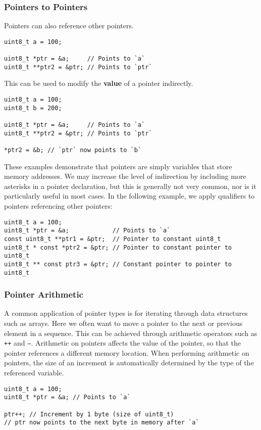 \documentclass{article}
\begin{document}
\subsubsection{Pointers to Pointers}
Pointers can also reference other pointers.
\begin{verbatim}
uint8_t a = 100;

uint8_t *ptr = &a;     // Points to `a`
uint8_t **ptr2 = &ptr; // Points to `ptr`
\end{verbatim}
This can be used to modify the \textbf{value} of a pointer indirectly.
\begin{verbatim}
uint8_t a = 100;
uint8_t b = 200;

uint8_t *ptr = &a;     // Points to `a`
uint8_t **ptr2 = &ptr; // Points to `ptr`

*ptr2 = &b; // `ptr` now points to `b`
\end{verbatim}
These examples demonstrate that pointers are simply variables that
store memory addresses. We may increase the level of indirection by
including more asterisks in a pointer declaration, but this is
generally not very common, nor is it particularly useful in most cases.
In the following example, we apply qualifiers to pointers referencing
other pointers:
\begin{verbatim}
uint8_t a = 100;
uint8_t *ptr = &a;            // Points to `a`
const uint8_t **ptr1 = &ptr;  // Pointer to constant uint8_t
uint8_t * const *ptr2 = &ptr; // Pointer to constant pointer to uint8_t
uint8_t ** const ptr3 = &ptr; // Constant pointer to pointer to uint8_t
\end{verbatim}
\subsubsection{Pointer Arithmetic}
A common application of pointer types is for iterating through data
structures such as arrays. Here we often want to move a pointer to the
next or previous element in a sequence. This can be achieved through
arithmetic operators such as \texttt{++} and \texttt{--}.
Arithmetic on pointers affects the value of the pointer, so that the
pointer references a different memory location. When performing
arithmetic on pointers, the size of an increment is automatically
determined by the type of the referenced variable.
\begin{verbatim}
uint8_t a = 100;
uint8_t *ptr = &a; // Points to `a`

ptr++; // Increment by 1 byte (size of uint8_t)
// ptr now points to the next byte in memory after `a`
\end{verbatim}
\end{document}
